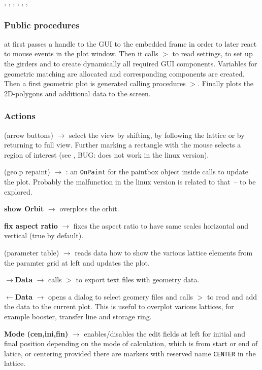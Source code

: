 \documentclass[12pt]{article}
\newcommand\code[1]{{\tt #1}}
\newcommand{\ofld}[1]{\colorbox{black!15}{{{\color{black}\bf #1}}}}
\newcommand{\ofldx}[1]{\colorbox{black!15}{{\color{black}(#1)}}}
\newcommand\guico[1]{{\color{blue}\code{#1}}}
\newcommand\guifco[1]{{\color{violet}\code{#1}}}
\newcommand{\unico}[1]{{\color{burntorange}\code{#1}}}
\newcommand{\evcod}[2]{\ofld{#1} $\rightarrow$ \guico{#2}}
\newcommand{\evcodx}[2]{\ofldx{#1} $\rightarrow$ \guico{#2}}
\newcommand{\prcod}[2]{\opauni{#1}$>$\unico{#2}}
\newcommand{\opaguif}[1]{\colorbox{violet!30}{{\color{black}\code{#1}}}}
\newcommand{\oguif}[1]{\hyperref[#1]{\opaguif{#1}}}
\newcommand{\opauni}[1]{\colorbox{orange!30}{{\color{black}\code{#1}}}}
\newcommand{\ouni}[1]{\hyperref[#1]{\opauni{#1}}}
\newcommand{\uses}[1]{\flushleft {\bf Uses:} #1}
\newcommand{\act}[1]{\subsubsection*{Actions} #1}
\newcommand{\ppro}[1]{\subsubsection*{Public procedures} #1}
\newcommand{\todo}[1]{{\color{red} #1}}
\begin{document}
\uses{\ouni{globlib}, \ouni{varlib}, \ouni{georblib}, \ouni{linoplib}, \ouni{mathlib}, \oguif{comfigureframe}, \ouni{comauxlib}}

\ppro{
\guico{Start} at first passes a handle to the GUI to the embedded \oguif{comfigureframe} frame \guico{geo} in order to later react to mouse events in the plot window. Then it calls \prcod{georblib}{GeoInit} to read settings, to set up the girders and to create dynamically all required GUI components. Variables for geometric matching are allocated and corresponding components are created. Then a first geometric plot is generated calling procedures \prcod{georblib}{CalcOrbit,CalcFaces,TransPoly,GeoMinMax}. Finally
\guico{MakePlot} plots the 2D-polygons and additional data to the screen. 
}


\act{}
\evcodx{arrow buttons}{but(Left,Right,Up,Down,SForward,SBackward,ZoomFull)Click} select the view by shifting, by following the lattice or by returning to full view. Further marking a rectangle with the mouse selects a region of interest (see \oguif{comfigureframe}, \todo{BUG: does not work in the linux version}).

\evcodx{geo.p repaint}{geopPaint}: an \code{OnPaint} for the paintbox object \guifco{p} inside \guifco{geo} calls \guico{MakePlot} to update the plot. \todo{Probably the malfunction in the linux version is related to that~-- to be explored.}

\evcod{show Orbit}{chkOrbitClick} overplots the orbit.

\evcod{fix aspect ratio}{chkAspratClick} fixes the aspect ratio to have same scales horizontal and vertical (true by default).

\evcodx{parameter table}{GridParamKeyPressed} reads data how to show the various lattice elements from the paramter grid at left and updates the plot.

\evcod{$\longrightarrow$Data}{butListClick} calls \prcod{georblib}{WriteGEoFiles} to export text files with geometry data.

\evcod{$\longleftarrow$Data}{butListClick} opens a dialog to select geomery files and calls \prcod{georblib}{ReadGeoFiles} to read and add the data to the current plot. This is useful to overplot various lattices, for example booster, transfer line and storage ring.

\evcod{Mode (cen,ini,fin)}{rbdrawClick} enables/disables the edit fields at left for initial and final position depending on the mode of calculation, which is from start or end of latice, or centering provided there are markers with reserved name \code{CENTER} in the lattice.\\[1ex]
\end{document}
